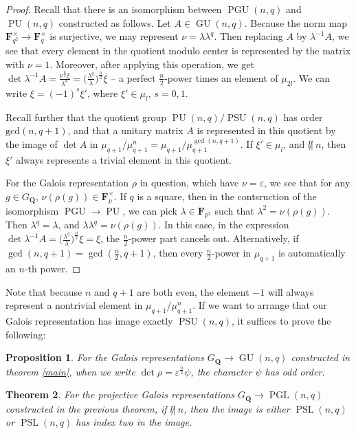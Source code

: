 \documentclass{article}
\newtheorem{theorem}{Theorem}
\newtheorem{proposition}[theorem]{Proposition}
\theoremstyle{definition}
\DeclareMathOperator{\GU}{\mathrm{GU}}
\DeclareMathOperator{\PGL}{\mathrm{PGL}}
\DeclareMathOperator{\PGU}{\mathrm{PGU}}
\DeclareMathOperator{\PU}{\mathrm{PU}}
\DeclareMathOperator{\PSL}{\mathrm{PSL}}
\DeclareMathOperator{\PSU}{\mathrm{PSU}}
\begin{document}
 	\begin{proof}
	Recall that there is an isomorphism between $\PGU(n,q)$ and $\PU(n,q)$ constructed as follows. Let $A \in \GU(n,q)$. Because the norm map $\mathbf{F}_{q^2}^{\times} \to \mathbf{F}_{q}^{\times}$ is surjective, we may represent $\nu = \lambda \lambda^{q}$. Then replacing $A$ by $\lambda^{-1}A$, we see that every element in the quotient modulo center is represented by the matrix with $\nu=1$. Moreover, after applying this operation, we get $\det \lambda^{-1}A = \frac{\nu^{\frac{n}{2}}\xi}{\lambda^n} = \Big(\frac{\lambda^{q}}{\lambda} \Big)^{\frac{n}{2}}\xi$ -- a perfect $\frac{n}{2}$-power times an element of $\mu_{2l}$. We can write $\xi = (-1)^s \xi'$, where $\xi' \in \mu_l$, $s = 0, 1$. \par 
	Recall further that the quotient group $\PU(n,q)/\PSU(n,q)$ has order $\mathrm{gcd}(n,q+1)$, and that a unitary matrix $A$ is represented in this quotient by the image of $\det A$ in $\mu_{q+1}/\mu_{q+1}^n = \mu_{q+1}/\mu_{q+1}^{\gcd(n,q+1)}$. If $\xi' \in \mu_l$, and $l {\not |}\ n$, then $\xi'$ always represents a trivial element in this quotient. \par 
	For the Galois representation $\rho$ in question, which have $\nu = \varepsilon$, we see that for any $g \in G_{\mathbf{Q}}$, $\nu(\rho(g)) \in \mathbf{F}_p^{\times}$. If $q$ is a square, then in the contsruction of the isomorphism $\PGU \to \PU$, we can pick $\lambda \in \mathbf{F}_{p^2}$ such that $\lambda^2 = \nu(\rho(g))$. Then $\lambda^q = \lambda$, and $\lambda \lambda^q = \nu(\rho(g))$. In this case, in the expression $\det \lambda^{-1}A = \Big(\frac{\lambda^{q}}{\lambda} \Big)^{\frac{n}{2}}\xi = \xi$, the $\frac{n}{2}$-power part cancels out. Alternatively, if $\gcd(n,q+1)=\gcd(\frac{n}{2},q+1)$, then every $\frac{n}{2}$-power in $\mu_{q+1}$ is automatically an $n$-th power. \par 
	\end{proof}
	Note that because $n$ and $q+1$ are both even, the element $-1$ will always represent a nontrivial element in $\mu_{q+1}/\mu_{q+1}^n$. If we want to arrange that our Galois representation has image exactly $\PSU(n,q)$, it suffices to prove the following:
	\begin{proposition} \label{odd}
		For the Galois representations $G_{\mathbf{Q}} \to \GU(n,q)$ constructed in theorem \ref{main}, when we write $\det \rho = \varepsilon^{\frac{n}{2}} \psi$, the character $\psi$ has odd order.
	\end{proposition}
	\begin{theorem} \label{linear}
		For the projective Galois representations $G_{\mathbf{Q}} \to \PGL(n,q)$ constructed in the previous theorem, if  $l {\not |}\ n$, then the image is either $\PSL(n,q)$ or $\PSL(n,q)$ has index two in the image.
	\end{theorem}
\end{document}
